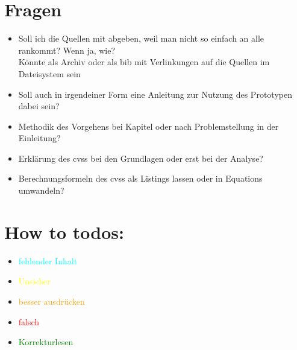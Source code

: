 \section*{Fragen}
    \begin{itemize}
        \item Soll ich die Quellen mit abgeben, weil man nicht so einfach an alle rankommt? Wenn ja, wie?\\
            Könnte als Archiv oder als bib mit Verlinkungen auf die Quellen im Dateisystem sein
        \item Soll auch in irgendeiner Form eine Anleitung zur Nutzung des Prototypen dabei sein?
        \item Methodik des Vorgehens bei Kapitel oder nach Problemstellung in der Einleitung?
        \item Erklärung des \gls{cvss} bei den Grundlagen oder erst bei der Analyse?
        \item Berechnungsformeln des \gls{cvss} als Listings lassen oder in Equations umwandeln?
    \end{itemize}
    
\section*{How to todos:}
    \begin{itemize}
        \item \textcolor{cyan}{fehlender Inhalt}
        \item \textcolor{yellow}{Unsicher}
        \item \textcolor{orange}{besser ausdrücken}
        \item \textcolor{red}{falsch}
        \item \textcolor{green}{Korrekturlesen}
    \end{itemize}
    
